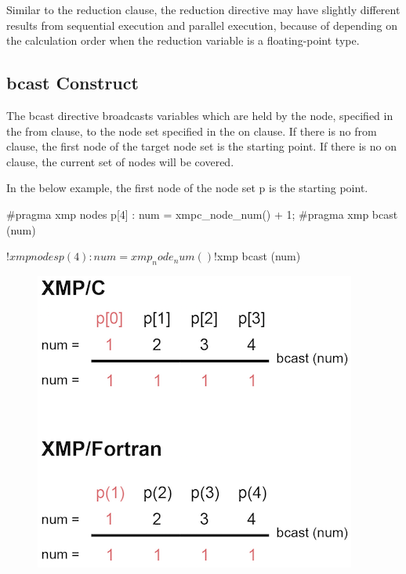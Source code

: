 \begin{mynote}
Similar to the reduction clause, the reduction
directive may have
slightly different results from sequential execution and parallel
execution, because of depending on the calculation order when the
reduction variable is a floating-point type.
\end{mynote}


\subsection{{\bf bcast} Construct}

The bcast directive broadcasts variables which are held by the node,
specified in the from clause, to the node set specified in the on
clause. If there is no from clause, the first node of the target node
set is the starting point. If there is no on clause, the current set of
nodes will be covered.

In the below example, the first node of the node set p is the starting point.

\begin{XCexample}
#pragma xmp nodes p[4]
  :
num = xmpc_node_num() + 1;
#pragma xmp bcast (num)
\end{XCexample}

\begin{XFexample}
!$xmp nodes p(4)
  :
num = xmp_node_num()
!$xmp bcast (num)
\end{XFexample}

\begin{figure}
  \centering
  \includegraphics{figs/bcast.png}
\end{figure}

